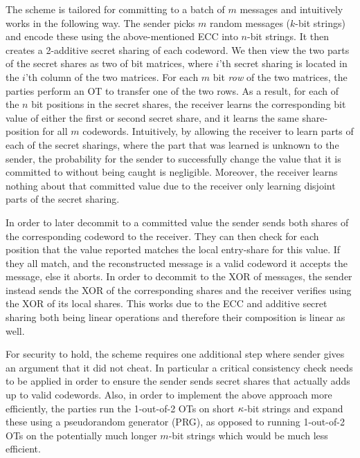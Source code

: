 The \cite{DBLP:conf/tcc/FrederiksenJNT16} scheme is tailored for committing to a batch of $m$ messages and intuitively works in the following way. The sender picks $m$ random messages ($k$-bit strings) and encode these using the above-mentioned ECC into $n$-bit strings. It then creates a 2-additive secret sharing of each codeword. We then view the two parts of the secret shares as two of bit matrices, where $i$'th secret sharing is located in the $i$'th column of the two matrices. For each $m$ bit \emph{row} of the two matrices, the parties perform an OT to transfer one of the two rows. As a result, for each of the $n$ bit positions in the secret shares, the receiver learns the corresponding bit value of either the first or second secret share, and it learns the same share-position for all $m$ codewords. Intuitively, by allowing the receiver to learn parts of each of the secret sharings, where the part that was learned is unknown to the sender, the probability for the sender to successfully change the value that it is committed to without being caught is negligible. Moreover, the receiver learns nothing about that committed value due to the receiver only learning disjoint parts of the secret sharing.

In order to later decommit to a committed value the sender sends both shares of the corresponding codeword to the receiver. They can then check for each position that the value reported matches the local entry-share for this value. If they all match, and the reconstructed message is a valid codeword it accepts the message, else it aborts. In order to decommit to the XOR of messages, the sender instead sends the XOR of the corresponding shares and the receiver verifies using the XOR of its local shares. This works due to the ECC and additive secret sharing both being linear operations and therefore their composition is linear as well. 

For security to hold, the scheme requires one additional step where sender gives an argument that it did not cheat. In particular a critical consistency check needs to be applied in order to ensure the sender sends secret shares that actually adds up to valid codewords. Also, in order to implement the above approach more efficiently, the parties run the 1-out-of-2 OTs on short $\kappa$-bit strings and expand these using a pseudorandom generator (PRG), as opposed to running 1-out-of-2 OTs on the potentially much longer $m$-bit strings which would be much less efficient.